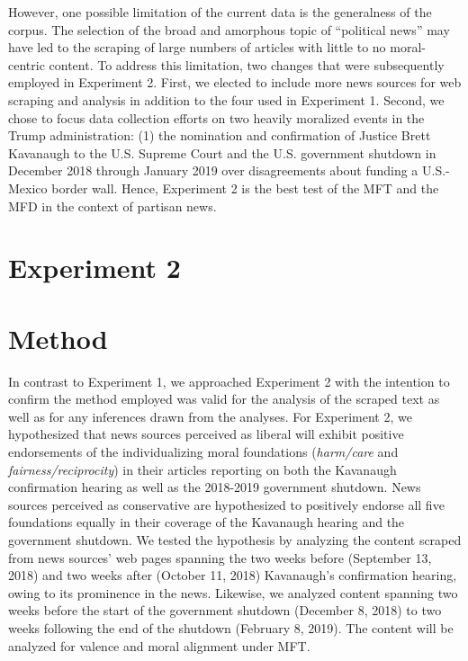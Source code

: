 \documentclass[
  english,
  man,floatsintext]{apa6}
\begin{document}
However, one possible limitation of the current data is the generalness of the corpus. The selection of the broad and amorphous topic of ``political news'' may have led to the scraping of large numbers of articles with little to no moral-centric content. To address this limitation, two changes that were subsequently employed in Experiment 2. First, we elected to include more news sources for web scraping and analysis in addition to the four used in Experiment 1. Second, we chose to focus data collection efforts on two heavily moralized events in the Trump administration: (1) the nomination and confirmation of Justice Brett Kavanaugh to the U.S. Supreme Court and the U.S. government shutdown in December 2018 through January 2019 over disagreements about funding a U.S.-Mexico border wall. Hence, Experiment 2 is the best test of the MFT and the MFD in the context of partisan news.

\hypertarget{experiment-2}{%
\section{Experiment 2}\label{experiment-2}}

\hypertarget{method-1}{%
\section{Method}\label{method-1}}

In contrast to Experiment 1, we approached Experiment 2 with the intention to confirm the method employed was valid for the analysis of the scraped text as well as for any inferences drawn from the analyses. For Experiment 2, we hypothesized that news sources perceived as liberal will exhibit positive endorsements of the individualizing moral foundations (\emph{harm/care} and \emph{fairness/reciprocity}) in their articles reporting on both the Kavanaugh confirmation hearing as well as the 2018-2019 government shutdown. News sources perceived as conservative are hypothesized to positively endorse all five foundations equally in their coverage of the Kavanaugh hearing and the government shutdown. We tested the hypothesis by analyzing the content scraped from news sources' web pages spanning the two weeks before (September 13, 2018) and two weeks after (October 11, 2018) Kavanaugh's confirmation hearing, owing to its prominence in the news. Likewise, we analyzed content spanning two weeks before the start of the government shutdown (December 8, 2018) to two weeks following the end of the shutdown (February 8, 2019). The content will be analyzed for valence and moral alignment under MFT.
\end{document}

